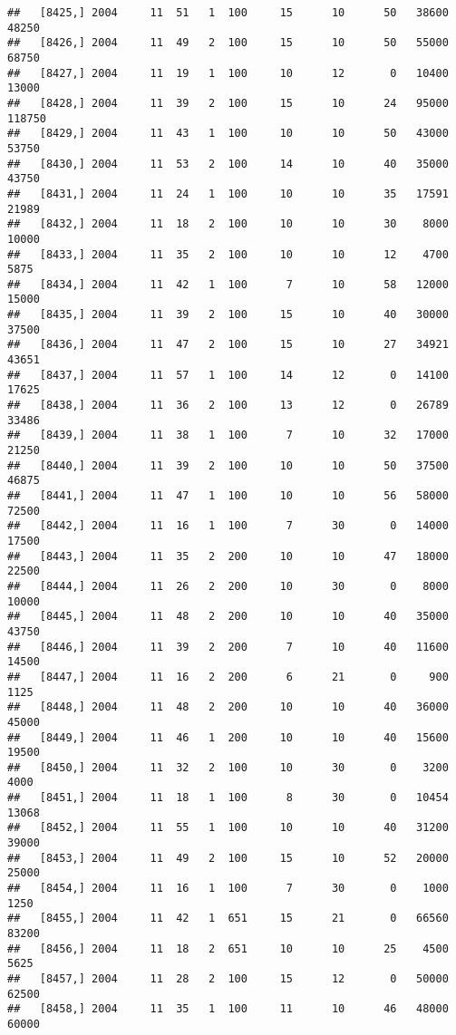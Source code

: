 \documentclass{article}\usepackage[]{graphicx}\usepackage[]{color}
\makeatletter
\newenvironment{kframe}{%
 \def\at@end@of@kframe{}%
 \ifinner\ifhmode%
  \def\at@end@of@kframe{\end{minipage}}%
  \begin{minipage}{\columnwidth}%
 \fi\fi%
 \def\FrameCommand##1{\hskip\@totalleftmargin \hskip-\fboxsep
 \colorbox{shadecolor}{##1}\hskip-\fboxsep
     \hskip-\linewidth \hskip-\@totalleftmargin \hskip\columnwidth}%
 \MakeFramed {\advance\hsize-\width
   \@totalleftmargin\z@ \linewidth\hsize
   \@setminipage}}%
 {\par\unskip\endMakeFramed%
 \at@end@of@kframe}
\newenvironment{knitrout}{}{} %
\makeatother
\begin{document}
\begin{knitrout}
\begin{kframe}
\begin{verbatim}
##   [8425,] 2004     11  51   1  100     15      10      50   38600   48250
##   [8426,] 2004     11  49   2  100     15      10      50   55000   68750
##   [8427,] 2004     11  19   1  100     10      12       0   10400   13000
##   [8428,] 2004     11  39   2  100     15      10      24   95000  118750
##   [8429,] 2004     11  43   1  100     10      10      50   43000   53750
##   [8430,] 2004     11  53   2  100     14      10      40   35000   43750
##   [8431,] 2004     11  24   1  100     10      10      35   17591   21989
##   [8432,] 2004     11  18   2  100     10      10      30    8000   10000
##   [8433,] 2004     11  35   2  100     10      10      12    4700    5875
##   [8434,] 2004     11  42   1  100      7      10      58   12000   15000
##   [8435,] 2004     11  39   2  100     15      10      40   30000   37500
##   [8436,] 2004     11  47   2  100     15      10      27   34921   43651
##   [8437,] 2004     11  57   1  100     14      12       0   14100   17625
##   [8438,] 2004     11  36   2  100     13      12       0   26789   33486
##   [8439,] 2004     11  38   1  100      7      10      32   17000   21250
##   [8440,] 2004     11  39   2  100     10      10      50   37500   46875
##   [8441,] 2004     11  47   1  100     10      10      56   58000   72500
##   [8442,] 2004     11  16   1  100      7      30       0   14000   17500
##   [8443,] 2004     11  35   2  200     10      10      47   18000   22500
##   [8444,] 2004     11  26   2  200     10      30       0    8000   10000
##   [8445,] 2004     11  48   2  200     10      10      40   35000   43750
##   [8446,] 2004     11  39   2  200      7      10      40   11600   14500
##   [8447,] 2004     11  16   2  200      6      21       0     900    1125
##   [8448,] 2004     11  48   2  200     10      10      40   36000   45000
##   [8449,] 2004     11  46   1  200     10      10      40   15600   19500
##   [8450,] 2004     11  32   2  100     10      30       0    3200    4000
##   [8451,] 2004     11  18   1  100      8      30       0   10454   13068
##   [8452,] 2004     11  55   1  100     10      10      40   31200   39000
##   [8453,] 2004     11  49   2  100     15      10      52   20000   25000
##   [8454,] 2004     11  16   1  100      7      30       0    1000    1250
##   [8455,] 2004     11  42   1  651     15      21       0   66560   83200
##   [8456,] 2004     11  18   2  651     10      10      25    4500    5625
##   [8457,] 2004     11  28   2  100     15      12       0   50000   62500
##   [8458,] 2004     11  35   1  100     11      10      46   48000   60000

\end{verbatim}
\end{kframe}
\end{knitrout}
\end{document}
